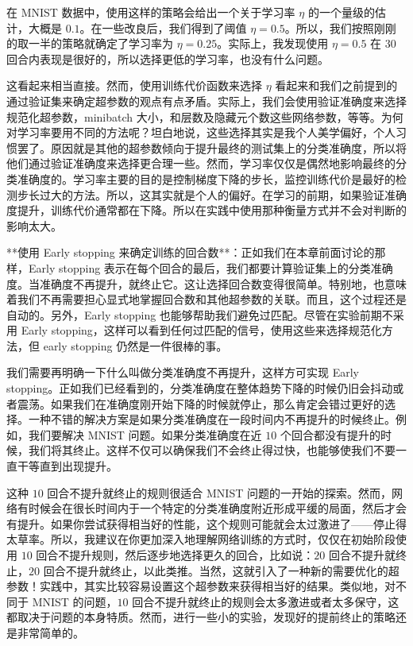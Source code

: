 在 MNIST 数据中，使用这样的策略会给出一个关于学习率 $\eta$ 的一个量级的估计，大概是 $0.1$。在一些改良后，我们得到了阈值 $\eta=0.5$。所以，我们按照刚刚的取一半的策略就确定了学习率为 $\eta=0.25$。实际上，我发现使用 $\eta=0.5$ 在 $30$ 回合内表现是很好的，所以选择更低的学习率，也没有什么问题。

这看起来相当直接。然而，使用训练代价函数来选择 $\eta$ 看起来和我们之前提到的通过验证集来确定超参数的观点有点矛盾。实际上，我们会使用验证准确度来选择规范化超参数，minibatch 大小，和层数及隐藏元个数这些网络参数，等等。为何对学习率要用不同的方法呢？坦白地说，这些选择其实是我个人美学偏好，个人习惯罢了。原因就是其他的超参数倾向于提升最终的测试集上的分类准确度，所以将他们通过验证准确度来选择更合理一些。然而，学习率仅仅是偶然地影响最终的分类准确度的。学习率主要的目的是控制梯度下降的步长，监控训练代价是最好的检测步长过大的方法。所以，这其实就是个人的偏好。在学习的前期，如果验证准确度提升，训练代价通常都在下降。所以在实践中使用那种衡量方式并不会对判断的影响太大。

**使用 Early stopping 来确定训练的回合数**：正如我们在本章前面讨论的那样，Early stopping 表示在每个回合的最后，我们都要计算验证集上的分类准确度。当准确度不再提升，就终止它。这让选择回合数变得很简单。特别地，也意味着我们不再需要担心显式地掌握回合数和其他超参数的关联。而且，这个过程还是自动的。另外，Early stopping 也能够帮助我们避免过匹配。尽管在实验前期不采用 Early stopping，这样可以看到任何过匹配的信号，使用这些来选择规范化方法，但 early stopping 仍然是一件很棒的事。

我们需要再明确一下什么叫做分类准确度不再提升，这样方可实现 Early stopping。正如我们已经看到的，分类准确度在整体趋势下降的时候仍旧会抖动或者震荡。如果我们在准确度刚开始下降的时候就停止，那么肯定会错过更好的选择。一种不错的解决方案是如果分类准确度在一段时间内不再提升的时候终止。例如，我们要解决 MNIST 问题。如果分类准确度在近 $10$ 个回合都没有提升的时候，我们将其终止。这样不仅可以确保我们不会终止得过快，也能够使我们不要一直干等直到出现提升。

这种 $10$ 回合不提升就终止的规则很适合 MNIST 问题的一开始的探索。然而，网络有时候会在很长时间内于一个特定的分类准确度附近形成平缓的局面，然后才会有提升。如果你尝试获得相当好的性能，这个规则可能就会太过激进了——停止得太草率。所以，我建议在你更加深入地理解网络训练的方式时，仅仅在初始阶段使用 $10$ 回合不提升规则，然后逐步地选择更久的回合，比如说：$20$ 回合不提升就终止，$20$ 回合不提升就终止，以此类推。当然，这就引入了一种新的需要优化的超参数！实践中，其实比较容易设置这个超参数来获得相当好的结果。类似地，对不同于 MNIST 的问题，$10$ 回合不提升就终止的规则会太多激进或者太多保守，这都取决于问题的本身特质。然而，进行一些小的实验，发现好的提前终止的策略还是非常简单的。


